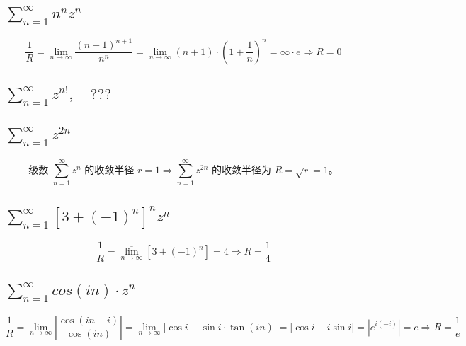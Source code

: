 \documentclass[UTF8]{report}
\theoremstyle{MyLineTheoremStyle} %
\theoremstyle{MyBlockTheoremStyle} %
\theoremstyle{MySubsubsectionStyle} %
\begin{document}
\subsection{$\sum_{n=1}^{\infty} n^n z^n $}
\noindent
\begin{equation}
    \frac{1}{R} = \lim_{n \to \infty} \frac{(n+1)^{n+1}}{n^n} = \lim_{n \to \infty} (n+1)\cdot \left(1 + \frac{1}{n}\right)^n = \infty \cdot e \Longrightarrow R = 0
\end{equation}

\subsection{$\sum_{n=1}^{\infty} z^{n!},\quad 
???
$}

\subsection{$\sum_{n=1}^{\infty} z^{2n}$}
\noindent
\begin{equation}
\text{级数 $\sum_{n=1}^{\infty} z^{n} $ 的收敛半径 $r = 1 \Longrightarrow  \sum_{n=1}^{\infty} z^{2n}$ 的收敛半径为 $R = \sqrt{r} = 1$。}
\end{equation}



\subsection{$\sum_{n=1}^{\infty} \left[3 + (-1)^n\right]^n z^n$}
\noindent
\begin{equation}
\frac{1}{R} = \overline{\lim_{n \to \infty}} \left[3 + (-1)^n\right] = 4 \Longrightarrow R = \frac{1}{4}
\end{equation}


\subsection{$\sum_{n=1}^{\infty} cos(in) \cdot z^n$}
\noindent
\begin{equation}
\frac{1}{R} 
= \lim_{n \to \infty} \left| \frac{\cos (in+i)}{\cos (in)} \right| 
= \lim_{n \to \infty} \left| \cos i - \sin i \cdot \tan (in) \right|
= \left| \cos i - i\sin i \right|
= | e^{i(-i)} | = e \Longrightarrow R = \frac{1}{e}
\end{equation}
\end{document}
